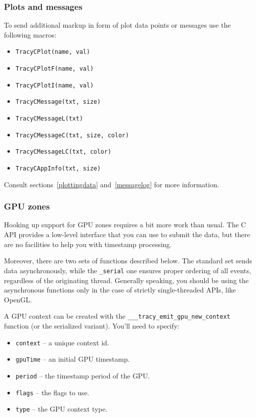 \documentclass[hidelinks,titlepage,a4paper,twoside]{article}
\begin{document}
\subsubsection{Plots and messages}

To send additional markup in form of plot data points or messages use the following macros:

\begin{itemize}
\item \texttt{TracyCPlot(name, val)}
\item \texttt{TracyCPlotF(name, val)}
\item \texttt{TracyCPlotI(name, val)}
\item \texttt{TracyCMessage(txt, size)}
\item \texttt{TracyCMessageL(txt)}
\item \texttt{TracyCMessageC(txt, size, color)}
\item \texttt{TracyCMessageLC(txt, color)}
\item \texttt{TracyCAppInfo(txt, size)}
\end{itemize}

Consult sections~\ref{plottingdata} and~\ref{messagelog} for more information.

\subsubsection{GPU zones}

Hooking up support for GPU zones requires a bit more work than usual. The C API provides a low-level interface that you can use to submit the data, but there are no facilities to help you with timestamp processing.

Moreover, there are two sets of functions described below. The standard set sends data asynchronously, while the \texttt{\_serial} one ensures proper ordering of all events, regardless of the originating thread. Generally speaking, you should be using the asynchronous functions only in the case of strictly single-threaded APIs, like OpenGL.

A GPU context can be created with the \texttt{\_\_\_tracy\_emit\_gpu\_new\_context} function (or the serialized variant). You'll need to specify:

\begin{itemize}
\item \texttt{context} -- a unique context id.
\item \texttt{gpuTime} -- an initial GPU timestamp.
\item \texttt{period} -- the timestamp period of the GPU.
\item \texttt{flags} -- the flags to use.
\item \texttt{type} -- the GPU context type.
\end{itemize}
\end{document}
